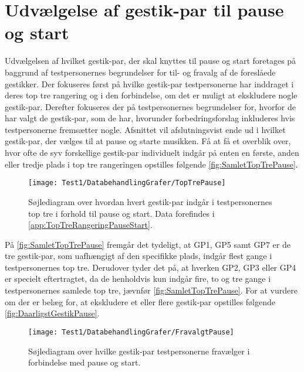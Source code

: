\section{Udvælgelse af gestik-par til pause og start}
\label{TestresultaterPauseStart}
%
Udvælgelsen af hvilket gestik-par, der skal knyttes til pause og start foretages på baggrund af testpersonernes begrundelser for til- og fravalg af de foreslåede gestikker. Der fokuseres først på hvilke gestik-par testpersonerne har inddraget i deres top tre rangering og i den forbindelse, om det er muligt at ekskludere nogle gestik-par. Derefter fokuseres der på testpersonernes begrundelser for, hvorfor de har valgt de gestik-par, som de har, hvorunder forbedringsforslag inkluderes hvis testpersonerne fremsætter nogle. Afsnittet vil afslutningsvist ende ud i hvilket gestik-par, der vælges til at pause og starte musikken.\blankline
%
Få at få et overblik over, hvor ofte de syv forskellige gestik-par individuelt indgår på enten en første, anden eller tredje plads i top tre rangeringen opstilles følgende \autoref{fig:SamletTopTrePause}. 
%
\begin{figure}[H]
	\centering
	\texttt{[image: Test1/DatabehandlingGrafer/TopTrePause]}
	\caption{Søjlediagram over hvordan hvert gestik-par indgår i testpersonernes top tre i forhold til pause og start. Data forefindes i \autoref{app:TopTreRangeringPauseStart}.}
	\label{fig:SamletTopTrePause}
\end{figure}
\noindent
% 
På \autoref{fig:SamletTopTrePause} fremgår det tydeligt, at GP1, GP5 samt GP7 er de tre gestik-par, som uafhængigt af den specifikke plads, indgår flest gange i testpersonernes top tre. Derudover tyder det på, at hverken GP2, GP3 eller GP4 er specielt eftertragtet, da de henholdvis kun indgår fire, to og tre gange i testpersonernes samlede top tre, jævnfør \autoref{fig:SamletTopTrePause}. For at vurdere om der er belæg for, at ekskludere et eller flere gestik-par opstilles følgende \autoref{fig:DaarligstGestikPause}.  
%
\begin{figure}[H]
	\centering
	\texttt{[image: Test1/DatabehandlingGrafer/FravalgtPause]}
	\caption{Søjlediagram over hvilke gestik-par testpersonerne fravælger i forbindelse med pause og start.}
	\label{fig:DaarligstGestikPause}
\end{figure}
\noindent
%
